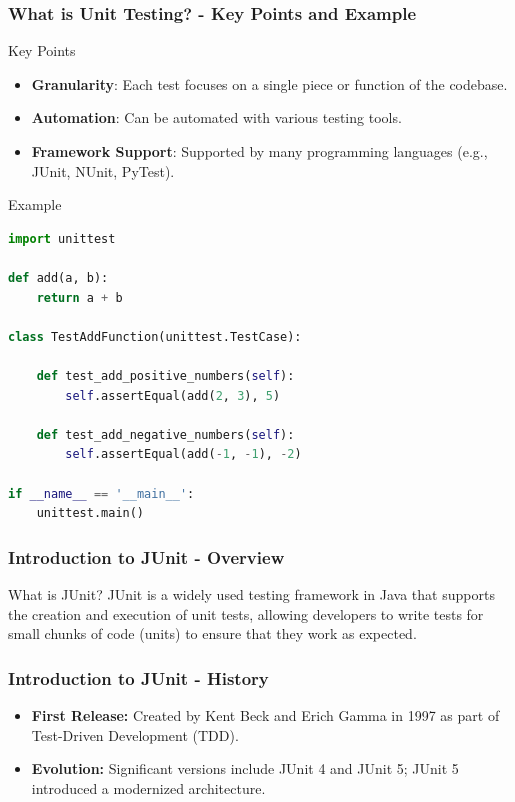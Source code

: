 \documentclass{beamer}
\begin{document}
\begin{frame}[fragile]
    \frametitle{What is Unit Testing? - Key Points and Example}
    \begin{block}{Key Points}
        \begin{itemize}
            \item \textbf{Granularity}: Each test focuses on a single piece or function of the codebase.
            \item \textbf{Automation}: Can be automated with various testing tools.
            \item \textbf{Framework Support}: Supported by many programming languages (e.g., JUnit, NUnit, PyTest).
        \end{itemize}
    \end{block}
    
    \begin{block}{Example}
        \begin{lstlisting}[language=python]
import unittest

def add(a, b):
    return a + b

class TestAddFunction(unittest.TestCase):
    
    def test_add_positive_numbers(self):
        self.assertEqual(add(2, 3), 5)

    def test_add_negative_numbers(self):
        self.assertEqual(add(-1, -1), -2)

if __name__ == '__main__':
    unittest.main()
        \end{lstlisting}
    \end{block}
\end{frame}

\begin{frame}[fragile]
    \frametitle{Introduction to JUnit - Overview}
    \begin{block}{What is JUnit?}
        JUnit is a widely used testing framework in Java that supports the creation and execution of unit tests,
        allowing developers to write tests for small chunks of code (units) to ensure that they work as expected.
    \end{block}
\end{frame}

\begin{frame}[fragile]
    \frametitle{Introduction to JUnit - History}
    \begin{itemize}
        \item \textbf{First Release:} Created by Kent Beck and Erich Gamma in 1997 as part of Test-Driven Development (TDD).
        \item \textbf{Evolution:} Significant versions include JUnit 4 and JUnit 5; JUnit 5 introduced a modernized architecture.
    \end{itemize}
\end{frame}
\end{document}

